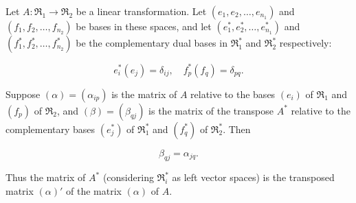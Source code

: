 Let $A : \mathfrak{R}_1 \to \mathfrak{R}_2$ be a linear transformation. Let $(e_1, e_2, \ldots, e_{n_1})$ and $(f_1, f_2, \ldots, f_{n_2})$ be bases in these spaces, and let $(e_1^*, e_2^*, \ldots, e_{n_1}^*)$ and $(f_1^*, f_2^*, \ldots, f_{n_2}^*)$ be the complementary dual bases in $\mathfrak{R}_1^*$ and $\mathfrak{R}_2^*$ respectively:

$$e_i^*(e_j) = \delta_{ij}, \quad f_p^*(f_q) = \delta_{pq}.$$

Suppose $(\alpha) = (\alpha_{ip})$ is the matrix of $A$ relative to the bases $(e_i)$ of $\mathfrak{R}_1$ and $(f_p)$ of $\mathfrak{R}_2$, and $(\beta) = (\beta_{qj})$ is the matrix of the transpose $A^*$ relative to the complementary bases $(e_j^*)$ of $\mathfrak{R}_1^*$ and $(f_q^*)$ of $\mathfrak{R}_2^*$. Then

$$\beta_{qj} = \alpha_{jq}.$$

Thus the matrix of $A^*$ (considering $\mathfrak{R}_i^*$ as left vector spaces) is the transposed matrix $(\alpha)'$ of the matrix $(\alpha)$ of $A$.
